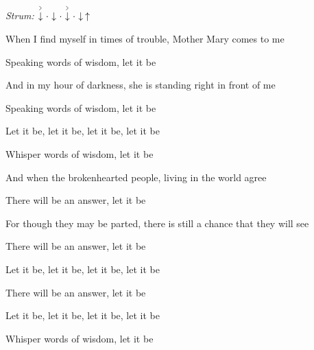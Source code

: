 \begin{song}


\begin{headerbox}
\RaiseBoxWithAccents
\textit{Strum:} $\AccentDown\Miss\Down\Miss\AccentDown\Miss\Down\Up$
\end{headerbox}

\begin{hchordbox}
\end{hchordbox}

\large

\bigskip

When I find myself in times of trouble, Mother Mary comes to me \par
{}Speaking words of wisdom, let it be    \par
And in my hour of darkness, she is standing right in front of me \par
{}Speaking words of wisdom, let it be    \par

\bigskip

Let it be, let it be, let it be, let it be \par
{}Whisper words of wisdom, let it be    \par

\bigskip

And when the brokenhearted people, living in the world agree \par
{}There will be an answer, let it be    \par
For though they may be parted, there is still a chance that they will see \par
{}There will be an answer, let it be    \par

\bigskip

Let it be, let it be, let it be, let it be \par
{}There will be an answer, let it be    \par
Let it be, let it be, let it be, let it be \par
{}Whisper words of wisdom, let it be    \par


\end{song}
